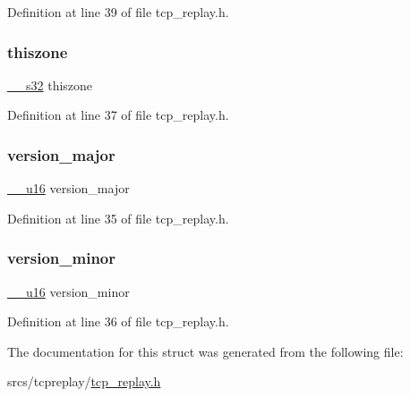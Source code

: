 Definition at line 39 of file tcp\+\_\+replay.\+h.

\mbox{\label{structpcap__hdr_a7e1a9866c3b96fa9e80047791b156da5}} 
\subsubsection{\texorpdfstring{thiszone}{thiszone}}
{\footnotesize\ttfamily \hyperlink{asm__types_8h_a375730bf3d49b04b76cd45693a00e5d5}{\+\_\+\+\_\+s32} thiszone}



Definition at line 37 of file tcp\+\_\+replay.\+h.

\mbox{\label{structpcap__hdr_aac1babfd335ddcb87664b00b3fc3044c}} 
\subsubsection{\texorpdfstring{version\+\_\+major}{version\_major}}
{\footnotesize\ttfamily \hyperlink{asm__types_8h_abc70358187152575fd05fbf6d253151f}{\+\_\+\+\_\+u16} version\+\_\+major}



Definition at line 35 of file tcp\+\_\+replay.\+h.

\mbox{\label{structpcap__hdr_a8cc4f2fea7a1ee09b4ef19cc89feceb2}} 
\subsubsection{\texorpdfstring{version\+\_\+minor}{version\_minor}}
{\footnotesize\ttfamily \hyperlink{asm__types_8h_abc70358187152575fd05fbf6d253151f}{\+\_\+\+\_\+u16} version\+\_\+minor}



Definition at line 36 of file tcp\+\_\+replay.\+h.



The documentation for this struct was generated from the following file\+:\begin{DoxyCompactItemize}
\item 
srcs/tcpreplay/\hyperlink{tcp__replay_8h}{tcp\+\_\+replay.\+h}\end{DoxyCompactItemize}
